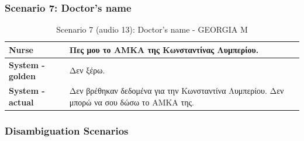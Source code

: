 \subsubsection{Scenario 7: Doctor's name}
\begin{table}[H]
\centering
\renewcommand{\arraystretch}{1.5} 
\begin{tabular}{|>{\bfseries}l|p{11cm}|}
\hline
Nurse & \textgreek{Πες μου το ΑΜΚΑ της Κωνσταντίνας Λυμπερίου.} \\
\hline
System - golden & \textgreek{Δεν ξέρω.} \\
\hline
System - actual & \textgreek{Δεν βρέθηκαν δεδομένα για την Κωνσταντίνα Λυμπερίου. Δεν μπορώ να σου δώσω το ΑΜΚΑ της.} \\
\hline
\end{tabular}
\caption{Scenario 7 (audio 13): Doctor's name - GEORGIA M}
\end{table}

\subsubsection{Disambiguation Scenarios}
